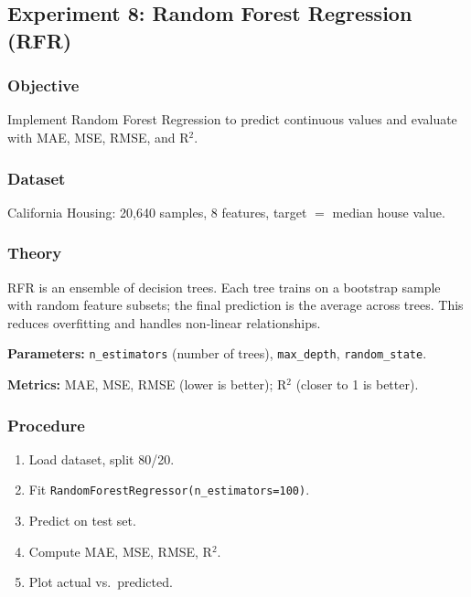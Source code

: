 \documentclass[a4paper,10pt]{article}
\begin{document}
\subsection{Experiment 8: Random Forest Regression (RFR)}

\subsubsection{Objective}
Implement Random Forest Regression to predict continuous values and evaluate with MAE, MSE, RMSE, and R\(^2\).

\subsubsection{Dataset}
California Housing: 20{,}640 samples, 8 features, target \(=\) median house value.

\subsubsection{Theory}
RFR is an ensemble of decision trees. Each tree trains on a bootstrap sample with random feature subsets; the final prediction is the average across trees. This reduces overfitting and handles non-linear relationships.

\textbf{Parameters:} \texttt{n\_estimators} (number of trees), \texttt{max\_depth}, \texttt{random\_state}.

\textbf{Metrics:} MAE, MSE, RMSE (lower is better); R\(^2\) (closer to 1 is better).

\subsubsection{Procedure}
\begin{enumerate}[nosep]
    \item Load dataset, split 80/20.
    \item Fit \texttt{RandomForestRegressor(n\_estimators=100)}.
    \item Predict on test set.
    \item Compute MAE, MSE, RMSE, R\(^2\).
    \item Plot actual vs.\ predicted.
\end{enumerate}
\end{document}
